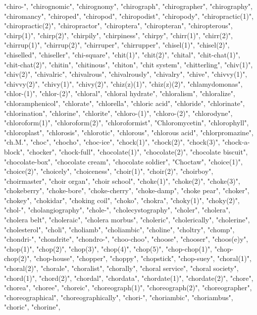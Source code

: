 "chiro-",
"chirognomic",
"chirognomy",
"chirograph",
"chirographer",
"chirography",
"chiromancy",
"chiroped",
"chiropod",
"chiropodist",
"chiropody",
"chiropractic(1)",
"chiropractic(2)",
"chiropractor",
"chiroptera",
"chiropteran",
"chiropterous",
"chirp(1)",
"chirp(2)",
"chirpily",
"chirpiness",
"chirpy",
"chirr(1)",
"chirr(2)",
"chirrup(1)",
"chirrup(2)",
"chirruper",
"chirrupper",
"chisel(1)",
"chisel(2)",
"chiselled",
"chiseller",
"chi-square",
"chit(1)",
"chit(2)",
"chital",
"chit-chat(1)",
"chit-chat(2)",
"chitin",
"chitinous",
"chiton",
"chit system",
"chitterling",
"chiv(1)",
"chiv(2)",
"chivalric",
"chivalrous",
"chivalrously",
"chivalry",
"chive",
"chivvy(1)",
"chivvy(2)",
"chivy(1)",
"chivy(2)",
"chiz(z)(1)",
"chiz(z)(2)",
"chlamydomonas",
"chlor-(1)",
"chlor-(2)",
"chloral",
"chloral hydrate",
"chloralism",
"chloralize",
"chloramphenicol",
"chlorate",
"chlorella",
"chloric acid",
"chloride",
"chlorinate",
"chlorination",
"chlorine",
"chlorite",
"chloro-(1)",
"chloro-(2)",
"chlorodyne",
"chloroform(1)",
"chloroform(2)",
"chloroformist",
"Chloromycetin",
"chlorophyll",
"chloroplast",
"chlorosis",
"chlorotic",
"chlorous",
"chlorous acid",
"chlorpromazine",
"ch.M.",
"choc",
"chocho",
"choc-ice",
"chock(1)",
"chock(2)",
"chock(3)",
"chock-a-block",
"chocker",
"chock-full",
"chocolate(1)",
"chocolate(2)",
"chocolate biscuit",
"chocolate-box",
"chocolate cream",
"chocolate soldier",
"Choctaw",
"choice(1)",
"choice(2)",
"choicely",
"choiceness",
"choir(1)",
"choir(2)",
"choirboy",
"choirmaster",
"choir organ",
"choir school",
"choke(1)",
"choke(2)",
"choke(3)",
"chokeberry",
"choke-bore",
"choke-cherry",
"choke-damp",
"choke pear",
"choker",
"chokey",
"chokidar",
"choking coil",
"choko",
"chokra",
"choky(1)",
"choky(2)",
"chol-",
"cholangiography",
"chole-",
"cholecystography",
"choler",
"cholera",
"cholera belt",
"choleraic",
"cholera morbus",
"choleric",
"cholerically",
"cholerine",
"cholesterol",
"choli",
"choliamb",
"choliambic",
"choline",
"choltry",
"chomp",
"chondri-",
"chondrite",
"chondro-",
"choo-choo",
"choose",
"chooser",
"choos(e)y",
"chop(1)",
"chop(2)",
"chop(3)",
"chop(4)",
"chop(5)",
"chop-chop(1)",
"chop-chop(2)",
"chop-house",
"chopper",
"choppy",
"chopstick",
"chop-suey",
"choral(1)",
"choral(2)",
"chorale",
"choralist",
"chorally",
"choral service",
"choral society",
"chord(1)",
"chord(2)",
"chordal",
"chordata",
"chordate(1)",
"chordate(2)",
"chore",
"chorea",
"choree",
"choreic",
"choreograph(1)",
"choreograph(2)",
"choreographer",
"choreographical",
"choreographically",
"chori-",
"choriambic",
"choriambus",
"choric",
"chorine",
